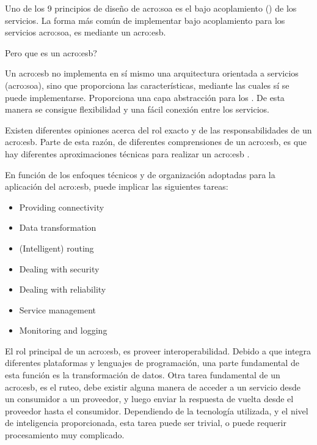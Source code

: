 
Uno de los 9 principios de diseño de \gls{acro:soa} es el bajo acoplamiento () de los servicios.  La forma más común de implementar bajo acoplamiento para los servicios \gls{acro:soa}, es mediante un \gls{acro:esb}.

Pero que es un \gls{acro:esb}?

Un \gls{acro:esb} no implementa en sí mismo una arquitectura orientada a servicios (\gls{acro:soa}), sino que proporciona las características, mediante las cuales sí se puede implementarse.  Proporciona una capa abstracción para los . De esta manera se consigue flexibilidad y una fácil conexión entre los servicios.

Existen diferentes opiniones acerca del rol exacto y de las responsabilidades de un \gls{acro:esb}.  Parte de esta razón, de diferentes comprensiones de un \gls{acro:esb}, es que hay diferentes aproximaciones técnicas para realizar un \gls{acro:esb} \cite[p.~47]{josuttis2007}.

En función de los enfoques técnicos y de organización adoptadas para la aplicación del \gls{acro:esb}, puede implicar las siguientes tareas:

\begin{itemize}
  \item Providing connectivity
  \item Data transformation
  \item (Intelligent) routing
  \item Dealing with security
  \item Dealing with reliability
  \item Service management
  \item Monitoring and logging
\end{itemize}

El rol principal de un \gls{acro:esb}, es proveer interoperabilidad.  Debido a que integra diferentes plataformas y lenguajes de programación, una parte fundamental de esta función es la transformación de datos.
Otra tarea fundamental de un \gls{acro:esb}, es el ruteo, debe existir alguna manera de acceder a un servicio desde un consumidor a un proveedor, y luego enviar la respuesta de vuelta desde el proveedor hasta el consumidor.
Dependiendo de la tecnología utilizada, y el nivel de inteligencia proporcionada, esta tarea puede ser trivial, o puede requerir procesamiento muy complicado.

